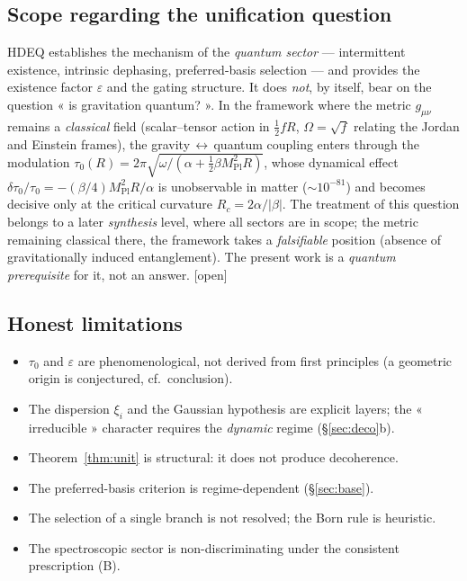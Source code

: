 \documentclass[11pt,a4paper]{article}
\newcommand{\statut}[1]{{\footnotesize\textsf{[#1]}}}
\theoremstyle{plain}
\theoremstyle{definition}
\theoremstyle{remark}
\begin{document}
\subsection{Scope regarding the unification question}
HDEQ establishes the mechanism of the \emph{quantum sector} --- intermittent
existence, intrinsic dephasing, preferred-basis selection --- and provides the
existence factor $\varepsilon$ and the gating structure. It does \emph{not}, by
itself, bear on the question « is gravitation quantum? ». In the framework where
the metric $g_{\mu\nu}$ remains a \emph{classical} field (scalar--tensor action in
$\tfrac12 fR$, $\Omega=\sqrt f$ relating the Jordan and Einstein frames), the
gravity$\,\leftrightarrow\,$quantum coupling enters through the modulation
$\tau_0(R)=2\pi\sqrt{\omega/(\alpha+\tfrac12\beta M_{\mathrm{Pl}}^2 R)}$, whose
dynamical effect $\delta\tau_0/\tau_0=-(\beta/4)M_{\mathrm{Pl}}^2 R/\alpha$ is
unobservable in matter ($\sim10^{-81}$) and becomes decisive only at the critical
curvature $R_c=2\alpha/|\beta|$. The treatment of this question belongs to a later
\emph{synthesis} level, where all sectors are in scope; the metric remaining
classical there, the framework takes a \emph{falsifiable} position (absence of
gravitationally induced entanglement). The present work is a \emph{quantum
prerequisite} for it, not an answer. \statut{open}

\subsection{Honest limitations}
\begin{itemize}
\item $\tau_0$ and $\varepsilon$ are phenomenological, not derived from first principles (a geometric origin is conjectured, cf.\ conclusion).
\item The dispersion $\xi_i$ and the Gaussian hypothesis are explicit layers; the « irreducible » character requires the \emph{dynamic} regime (\S\ref{sec:deco}b).
\item Theorem~\ref{thm:unit} is structural: it does not produce decoherence.
\item The preferred-basis criterion is regime-dependent (\S\ref{sec:base}).
\item The selection of a single branch is not resolved; the Born rule is heuristic.
\item The spectroscopic sector is non-discriminating under the consistent prescription (B).
\end{itemize}
\end{document}
